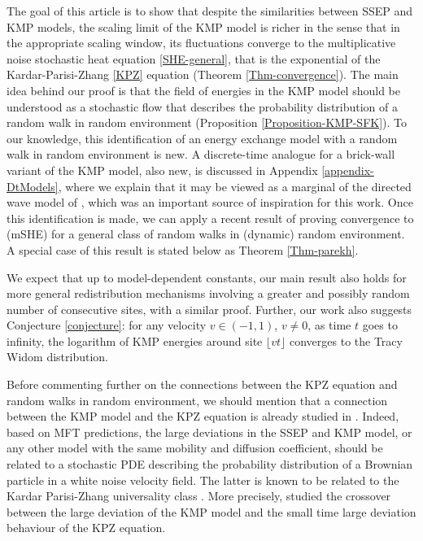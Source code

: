 \documentclass[a4paper,11pt,oneside,reqno]{amsart}
\theoremstyle{definition}
\numberwithin{equation}{section}
\begin{document}
\medskip 
The goal of this article is to show that despite the similarities between SSEP and KMP models, the scaling limit of the KMP model is richer in the sense that in the appropriate scaling window, its fluctuations converge to the multiplicative noise stochastic heat equation  \eqref{SHE-general}, that is the exponential of the Kardar-Parisi-Zhang \eqref{KPZ} equation  (Theorem \ref{Thm-convergence}). The main idea behind  our proof is that the field of energies in the KMP model should be understood as a stochastic flow that describes the probability distribution of a random walk in random environment (Proposition \ref{Proposition-KMP-SFK}). {\color{black}
To our knowledge, this identification of an energy exchange model with a random walk in random environment is new. A discrete-time analogue for a brick-wall variant of the KMP model, also new, is discussed in Appendix \ref{appendix-DtModels}, where we explain that it may be viewed as a marginal of the directed wave model of \cite{kardar1992}, which was an important source of inspiration for this work.}
Once this identification is made, we can apply a recent result of \cite{parekh2} proving convergence to (mSHE) for a general class of random walks in (dynamic) random environment. A special case of this result is stated below as Theorem \ref{Thm-parekh}.

\medskip 
We expect that up to model-dependent constants, our main result also holds for more general redistribution mechanisms involving a greater and possibly random number of consecutive sites,  with a similar proof. Further, our work also suggests Conjecture \ref{conjecture}: for any velocity $v\in (-1,1)$, $v\neq 0$,  as time $t$ goes to infinity,  the logarithm of KMP energies around site $\lfloor vt\rfloor$ converges to the Tracy Widom distribution.




\medskip 
 Before commenting further on the connections between the KPZ equation and random walks in random environment, we should mention that a connection between the KMP model and the KPZ equation is already studied in \cite{krajenbrink2023crossover}. Indeed, based on MFT predictions, the large deviations in the SSEP and KMP model, or any  other model with the same mobility and  diffusion coefficient,  should be related to a stochastic PDE describing the probability distribution of a Brownian particle in a white noise velocity field. The latter is known to be related to the Kardar Parisi-Zhang universality class \cite{leDoussal-17, barraquand2020large, B-LD-moderate}. More precisely,  \cite{krajenbrink2023crossover} studied the crossover between the large deviation of the KMP model and the small time large deviation behaviour of the KPZ equation. 
 
\end{document}
